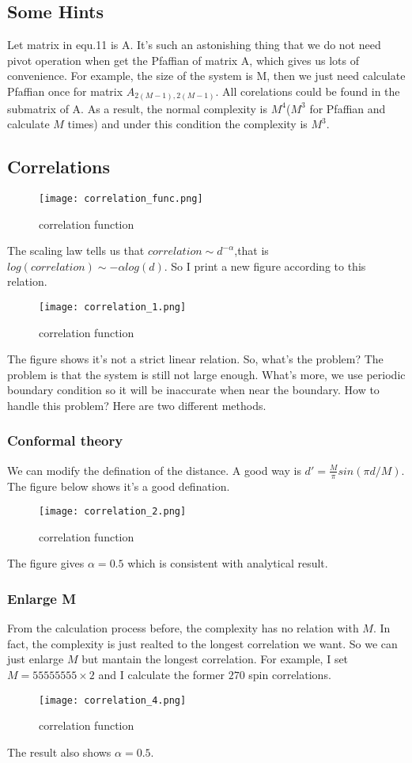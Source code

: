 \documentclass[UTF8]{ctexart}
\begin{document}
\subsection{Some Hints}
Let matrix in equ.11 is A. It's such an astonishing thing that we do not need pivot operation when get the Pfaffian of matrix A, which gives us lots of convenience. For example, the size of the system is M, then we just need calculate Pfaffian once for matrix $A_{2(M-1),2(M-1)}$. All corelations could be found in the submatrix of A. As a result, the normal complexity is $M^4$($M^3$ for Pfaffian and calculate $M$ times) and under this condition the complexity is $M^3$.
\subsection{Correlations}
\begin{figure}[H]
	\centering
	\texttt{[image: correlation\_func.png]}
	\caption{correlation function}
	\label{fig_1}
\end{figure}
The scaling law tells us that $correlation\sim d^{-\alpha}$,that is $log(correlation)\sim -\alpha log(d)$. So I print a new figure according to this relation.
\begin{figure}[H]
	\centering
	\texttt{[image: correlation\_1.png]}
	\caption{correlation function}
	\label{fig_1}
\end{figure}
The figure shows it's not a strict linear relation. So, what's the problem? The problem is that the system is still not large enough. What's more, we use periodic boundary condition so it will be inaccurate when near the boundary. How to handle this problem? Here are two different methods.
\subsubsection{Conformal theory}
We can modify the defination of the distance. A good way is $d'=\frac{M}{\pi}sin(\pi d/M)$. The figure below shows it's a good defination.
\begin{figure}[H]
	\centering
	\texttt{[image: correlation\_2.png]}
	\caption{correlation function}
	\label{fig_3}
\end{figure}
The figure gives $\alpha=0.5$ which is consistent with analytical result.
\subsubsection{Enlarge M}
From the calculation process before, the complexity has no relation with $M$. In fact, the complexity is just realted to the longest correlation we want. So we can just enlarge $M$ but mantain the longest correlation. For example, I set $M=55555555\times 2$ and I calculate the former $270$ spin correlations.
\begin{figure}[H]
	\centering
	\texttt{[image: correlation\_4.png]}
	\caption{correlation function}
	\label{fig_4}
\end{figure}
The result also shows $\alpha=0.5$.
\end{document}
